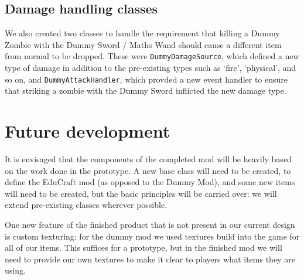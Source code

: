 \subsection{Damage handling classes}
We also created two classes to handle the requirement that killing a Dummy Zombie
with the Dummy Sword / Maths Wand should cause a different item from normal
to be dropped. These were \texttt{DummyDamageSource}, which defined a new type
of damage in addition to the pre-existing types such as `fire', `physical', and
so on, and \texttt{DummyAttackHandler}, which provded a new event handler to
ensure that striking a zombie with the Dummy Sword inflicted the new damage type.

\section{Future development}
It is envisaged that the components of the completed mod will be heavily based on
the work done in the prototype. A new base class will need to be created, to define
the EduCraft mod (as opposed to the Dummy Mod), and some new items will need to
be created, but the basic principles will be carried over: we will extend
pre-existing classes wherever possible.

One new feature of the finished product that is not present in our current design
is custom texturing: for the dummy mod we used textures build into the game for
all of our items. This suffices for a prototype, but in the finished mod we will
need to provide our own textures to make it clear to players what items they
are using.